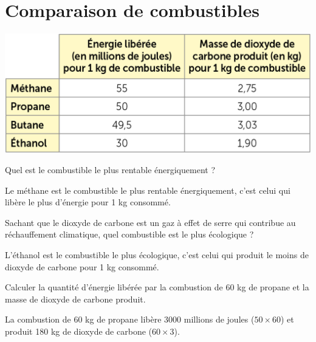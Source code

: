 \section{Comparaison de combustibles}\label{ex:comparaison}

\begin{center}
	\includegraphics[scale=0.5]{img/tab_combustibles}
\end{center}

\begin{questions}
	\question Quel est le combustible le plus rentable énergiquement ?
		\begin{solution}
			Le méthane est le combustible le plus rentable énergiquement, c'est celui qui libère le plus d'énergie pour 1 kg consommé.
		\end{solution}
	
	\question Sachant que le dioxyde de carbone est un gaz à effet de serre qui contribue au réchauffement climatique, quel combustible est le plus écologique ?
		\begin{solution}
			L'éthanol est le combustible le plus écologique, c'est celui qui produit le moins de dioxyde de carbone pour 1 kg consommé.
		\end{solution}
	
	\question Calculer la quantité d'énergie libérée par la combustion de 60 kg de propane et la masse de dioxyde de carbone produit.
		\begin{solution}
			La combustion de 60 kg de propane libère \num{3000} millions de joules ($50 \times 60$) et produit \num{180} kg de dioxyde de carbone ($60 \times 3$).
		\end{solution}
\end{questions}